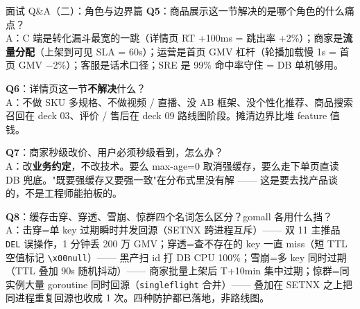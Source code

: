 \documentclass[aspectratio=169,11pt]{beamer}
\begin{document}
\begin{frame}[shrink]{面试 Q\&A（二）：角色与边界篇}
\small
\textbf{Q5}：商品展示这一节解决的是哪个角色的什么痛点？\\
A：C 端是转化漏斗最宽的一跳（详情页 RT +100ms = 跳出率 +2\%）；商家是\textbf{流量分配}（上架到可见 SLA = 60s）；运营是首页 GMV 杠杆（轮播加载慢 1s = 首页 GMV $-$2\%）；客服是话术口径；SRE 是 99\% 命中率守住 = DB 单机够用。

\vspace{1mm}
\textbf{Q6}：详情页这一节\textbf{不解决}什么？\\
A：不做 SKU 多规格、不做视频 / 直播、没 AB 框架、没个性化推荐、商品搜索召回在 deck 03、评价 / 售后在 deck 09 路线图阶段。摊清边界比堆 feature 值钱。

\vspace{1mm}
\textbf{Q7}：商家秒级改价、用户必须秒级看到，怎么办？\\
A：改\textbf{业务约定}，不改技术。要么 max-age=0 取消强缓存，要么走下单页直读 DB 兜底。"既要强缓存又要强一致"在分布式里没有解 —— 这是要去找产品谈的，不是工程师能拍板的。

\vspace{1mm}
\textbf{Q8}：缓存击穿、穿透、雪崩、惊群四个名词怎么区分？gomall 各用什么挡？\\
A：击穿=单 key 过期瞬时并发回源（SETNX 跨进程互斥）—— 双 11 主推品 \texttt{DEL} 误操作，1 分钟丢 200 万 GMV；穿透=查不存在的 key 一直 miss（短 TTL 空值标记 \texttt{\textbackslash x00null}）—— 黑产扫 id 打 DB CPU 100\%；雪崩=多 key 同时过期（TTL 叠加 90s 随机抖动）—— 商家批量上架后 T+10min 集中过期；惊群=同实例大量 goroutine 同时回源（\texttt{singleflight} 合并）—— 叠加在 SETNX 之上把同进程重复回源也收成 1 次。四种防护都已落地，非路线图。
\end{frame}
\end{document}
